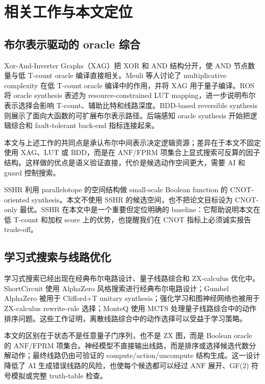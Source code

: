 \documentclass[UTF8,fontset=macnew,11pt]{ctexart}
\newcommand{\anf}{\ensuremath{\mathrm{ANF}}}
\newcommand{\fprm}{\ensuremath{\mathrm{FPRM}}}
\newcommand{\mcts}{\ensuremath{\mathrm{MCTS}}}
\newcommand{\ttable}{truth-table}
\begin{document}
\section{相关工作与本文定位}

\subsection{布尔表示驱动的 oracle 综合}

Xor-And-Inverter Graphs（XAG）把 XOR 和 AND 结构分开，使 AND 节点数量与低 T-count oracle 编译直接相关。Meuli 等人讨论了 multiplicative complexity 在低 T-count oracle 编译中的作用\cite{meuli2019multiplicative}，并将 XAG 用于量子编译\cite{meuli2022xag}。ROS 将 oracle synthesis 表述为 resource-constrained LUT mapping\cite{meuli2020ros}，进一步说明布尔表示选择会影响 T-count、辅助比特和线路深度。BDD-based reversible synthesis 则展示了面向大函数的可扩展布尔表示路径\cite{wille2009bdd}。后端感知 oracle synthesis 开始把逻辑综合和 fault-tolerant back-end 指标连接起来\cite{yu2025backend}。

本文与上述工作的共同点是承认布尔中间表示决定逻辑资源；差异在于本文不固定使用 XAG、LUT 或 BDD，而是在 \anf{}/\fprm{} 项集合上显式搜索可反算的因子结构。这样做的优点是语义验证直接，代价是候选动作空间更大，需要 AI 和 guard 控制搜索。

SSHR 利用 parallelotope 的空间结构做 small-scale Boolean function 的 CNOT-oriented synthesis\cite{zheng2025sshr}。本文不使用 SSHR 的候选空间，也不把论文目标设为 CNOT-only 最优。SSHR 在本文中是一个重要但定位明确的 baseline：它帮助说明本文在低 T-count 和加权 score 上的优势，也提醒我们在 CNOT 指标上必须诚实报告 trade-off。

\subsection{学习式搜索与线路优化}

学习式搜索已经出现在经典布尔电路设计、量子线路综合和 ZX-calculus 优化中。ShortCircuit 使用 AlphaZero 风格搜索进行经典布尔电路设计\cite{tsaras2024shortcircuit}；Gumbel AlphaZero 被用于 Clifford+T unitary synthesis\cite{rietsch2024unitary}；强化学习和图神经网络也被用于 ZX-calculus rewrite-rule 选择\cite{riu2025rlzx}；MonteQ 使用 \mcts{} 处理量子线路综合中的动作排序问题\cite{machiya2026monteq}。这些工作证明，离散线路综合中的动作选择可以受益于学习策略。

本文的区别在于状态不是任意量子门序列，也不是 ZX 图，而是 Boolean oracle 的 \anf{}/\fprm{} 项集合。神经模型不直接输出线路，而是排序或选择候选代数分解动作；最终线路仍由可验证的 compute/action/uncompute 结构生成。这一设计降低了 AI 生成错误线路的风险，也使每个候选都可以经过 \anf{} 展开、GF(2) 符号模拟或完整 \ttable{} 检查。
\end{document}
